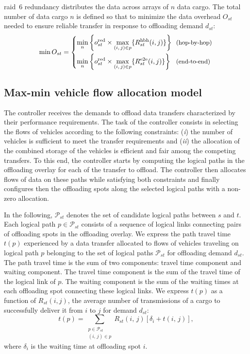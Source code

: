 \Acrshort{raid}~6 redundancy distributes the data across arrays of $n$ data cargo. The total number of data cargo $n$ is defined so that to minimize the data overhead $O_{st}$ needed to ensure reliable transfer in response to offloading demand $d_{st}$: 
\[
    \min O_{st}=\begin{dcases}
    \min_{n} \left\{ o_{st}^{\text{red}} \times \max_{(i,\,j)\in p}\{R_{st}^{\textrm{hbh}}(i,j)\} \right\} & \text{\!\!\small (hop-by-hop)}\\
    \min_{n} \left\{ o_{st}^{\text{red}} \times  \max_{(i,\,j)\in p}\{R_{st}^{\textrm{e2e}}(i,j)\} \right\} & \text{\!\!\small (end-to-end)}
    \end{dcases}
\]


\subsection{Max-min vehicle flow allocation model}
\label{sec:max-min-allocation-model}

The controller receives the demands to offload data transfers characterized by their performance requirements. The task of the controller consists in selecting the flows of vehicles according to the following constraints: (\textit{i}) the number of vehicles is sufficient to meet the transfer requirements and (\textit{ii}) the allocation of the combined storage of the vehicles is efficient and fair among the competing transfers. To this end, the controller starts by computing the logical paths in the offloading overlay for each of the transfer to offload. The controller then allocates flows of data on these paths while satisfying both constraints and finally configures then the offloading spots along the selected logical paths with a non-zero allocation.

In the following, $\mathcal{P}_{st}$ denotes the set of candidate logical paths between $s$ and $t$. Each logical path $p\in\mathcal{P}_{st}$ consists of a sequence of logical links connecting pairs of offloading spots in the offloading overlay. We express the path travel time $t(p)$ experienced by a data transfer allocated to flows of vehicles traveling on logical path $p$ belonging to the set of logical paths $\mathcal{P}_{st}$ for offloading demand $d_{st}$. The path travel time is the sum of two components: travel time component and waiting component. The travel time component is the sum of the travel time of the logical link of $p$. The waiting component is the sum of the waiting times at each offloading spot connecting these logical links. We express $t(p)$ as a function of $R_{st}(i,j)$, the average number of transmissions of a cargo to successfully deliver it from $i$ to $j$ for demand $d_{st}$:
\begin{equation}
    \label{eq:impl-logical-path-travel-time}
	t\left(p\right) = \sum_{\substack{p\in \mathcal{P}_{st}\\(i,\, j)\in p}} R_{st}(i,\,j)\left[\delta_{i} + t(i,\,j)\right],
\end{equation}
\noindent where $\delta_i$ is the waiting time at offloading spot $i$.


